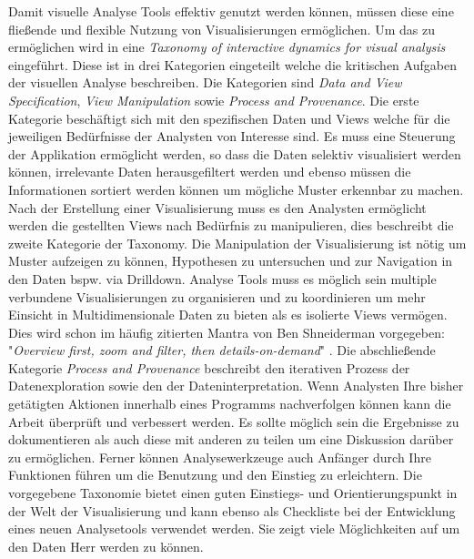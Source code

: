 \documentclass[draft=false
              ,paper=a4
              ,twoside=false
              ,fontsize=11pt
              ,headsepline
              ,BCOR10mm
              ,DIV11
              ]{scrbook}
\begin{document}
Damit visuelle Analyse Tools effektiv genutzt werden können, müssen diese eine fließende und flexible Nutzung von Visualisierungen ermöglichen. Um das zu ermöglichen wird in \cite{heer_interactive_2012} eine \textit{Taxonomy of interactive dynamics for visual analysis} eingeführt. Diese ist in drei Kategorien eingeteilt welche die kritischen Aufgaben der visuellen Analyse beschreiben. Die Kategorien sind \textit{Data and View Specification}, \textit{View Manipulation} sowie \textit{Process and Provenance}. Die erste Kategorie beschäftigt sich mit den spezifischen Daten und Views welche für die jeweiligen Bedürfnisse der Analysten von Interesse sind. Es muss eine Steuerung der Applikation ermöglicht werden, so dass die Daten selektiv visualisiert werden können, irrelevante Daten herausgefiltert werden und ebenso müssen die Informationen sortiert werden können um mögliche Muster erkennbar zu machen. Nach der Erstellung einer Visualisierung muss es den Analysten ermöglicht werden die gestellten Views nach Bedürfnis zu manipulieren, dies beschreibt die zweite Kategorie der Taxonomy. Die Manipulation der Visualisierung ist nötig um Muster aufzeigen zu können, Hypothesen zu untersuchen und zur Navigation in den Daten bspw. via Drilldown. Analyse Tools muss es möglich sein multiple verbundene Visualisierungen zu organisieren und zu koordinieren um mehr Einsicht in Multidimensionale Daten zu bieten als es isolierte Views vermögen. Dies wird schon im häufig zitierten Mantra von Ben Shneiderman vorgegeben: "\textit{Overview first, zoom and filter, then details-on-demand}" \cite{shneiderman_the_eyes_1996}. Die abschließende Kategorie \textit{Process and Provenance} beschreibt den iterativen Prozess der Datenexploration sowie den der Dateninterpretation. Wenn Analysten Ihre bisher getätigten Aktionen innerhalb eines Programms nachverfolgen können kann die Arbeit überprüft und verbessert werden. Es sollte möglich sein die Ergebnisse zu dokumentieren als auch diese mit anderen zu teilen um eine Diskussion darüber zu ermöglichen. Ferner können Analysewerkzeuge auch Anfänger durch Ihre Funktionen führen um die Benutzung und den Einstieg zu erleichtern.
Die vorgegebene Taxonomie bietet einen guten Einstiegs- und Orientierungspunkt in der Welt der Visualisierung und kann ebenso als Checkliste bei der Entwicklung eines neuen Analysetools verwendet werden. Sie zeigt viele Möglichkeiten auf um den Daten Herr werden zu können. 

\end{document}
